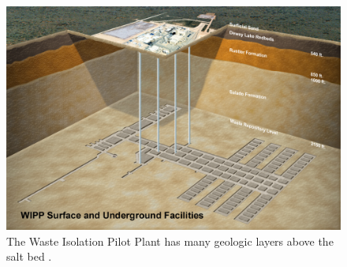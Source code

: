 \begin{figure}[htbp!]
  \begin{center}
    \includegraphics[width=0.7\textheight]{wipp_stratigraph.eps}
  \end{center}
  \caption{The Waste Isolation Pilot Plant has many geologic layers above the 
    salt bed \cite{doe_wipp_2013}.}
  \label{fig:wipp}
\end{figure}
